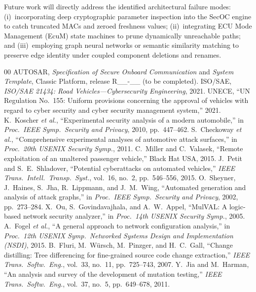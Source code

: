 \documentclass[journal]{IEEEtran}
\begin{document}
Future work will directly address the identified architectural failure modes: (i)~incorporating deep cryptographic parameter inspection into the SecOC engine to catch truncated MACs and zeroed freshness values; (ii)~integrating ECU Mode Management (EcuM) state machines to prune dynamically unreachable paths; and (iii)~employing graph neural networks or semantic similarity matching to preserve edge identity under coupled component deletions and renames.

\begin{thebibliography}{00}
 AUTOSAR, \emph{Specification of Secure Onboard Communication}
and \emph{System Template}, Classic Platform, release R\_\_-\_\_ (to be
completed). %
 ISO/SAE, \emph{ISO/SAE 21434: Road Vehicles---Cybersecurity
Engineering}, 2021.
 UNECE, ``UN Regulation No.~155: Uniform provisions concerning
the approval of vehicles with regard to cyber security and cyber security
management system,'' 2021.
 K.~Koscher \emph{et al.}, ``Experimental security analysis of
a modern automobile,'' in \emph{Proc.\ IEEE Symp.\ Security and Privacy}, 2010,
pp.~447--462.
 S.~Checkoway \emph{et al.}, ``Comprehensive experimental
analyses of automotive attack surfaces,'' in \emph{Proc.\ 20th USENIX Security
Symp.}, 2011.
 C.~Miller and C.~Valasek, ``Remote exploitation of an unaltered
passenger vehicle,'' Black Hat USA, 2015.
 J.~Petit and S.~E.~Shladover, ``Potential cyberattacks on
automated vehicles,'' \emph{IEEE Trans.\ Intell.\ Transp.\ Syst.}, vol.~16,
no.~2, pp.~546--556, 2015.
 O.~Sheyner, J.~Haines, S.~Jha, R.~Lippmann, and J.~M.~Wing,
``Automated generation and analysis of attack graphs,'' in \emph{Proc.\ IEEE
Symp.\ Security and Privacy}, 2002, pp.~273--284.
 X.~Ou, S.~Govindavajhala, and A.~W.~Appel, ``MulVAL: A logic-based
network security analyzer,'' in \emph{Proc.\ 14th USENIX Security Symp.}, 2005.
 A.~Fogel \emph{et al.}, ``A general approach to network
configuration analysis,'' in \emph{Proc.\ 12th USENIX Symp.\ Networked Systems
Design and Implementation (NSDI)}, 2015. %
 B.~Fluri, M.~W\"{u}rsch, M.~Pinzger, and H.~C.~Gall, ``Change
distilling: Tree differencing for fine-grained source code change extraction,''
\emph{IEEE Trans.\ Softw.\ Eng.}, vol.~33, no.~11, pp.~725--743, 2007.
 Y.~Jia and M.~Harman, ``An analysis and survey of the development
of mutation testing,'' \emph{IEEE Trans.\ Softw.\ Eng.}, vol.~37, no.~5,
pp.~649--678, 2011.
\end{thebibliography}
\end{document}
